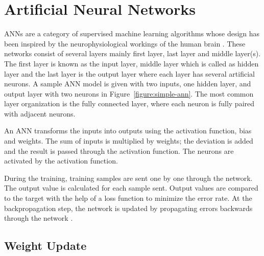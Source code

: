 
\section{Artificial Neural Networks}

    ANNs are a category of supervised machine learning algorithms whose design has been inspired by the neurophysiological workings of the human brain \cite{hill1994artificial}.
    These networks consist of several layers mainly first layer, last layer and middle layer(s).
    The first layer is known as the input layer, middle layer which is called as hidden layer and the last layer is the output layer where each layer has several artificial neurons.
    A sample ANN  model is given with two inputs, one hidden layer, and output layer with two neurons \cite{babu2000adaptive} in Figure~\ref{figure:simple-ann}.
    The most common layer organization is the fully connected layer, where each neuron is fully paired with adjacent neurons.

    An ANN transforms the inputs into outputs using the activation function, bias and weights.
    The sum of inputs is multiplied by weights; the deviation is added and the result is passed through the activation function.
    The neurons are activated by the activation function.

    

    During the training, training samples are sent one by one through the network.
    The output value is calculated for each sample sent.
    Output values are compared to the target with the help of a loss function to minimize the error rate.
    At the backpropagation step, the network is updated by propagating errors backwards through the network \cite{lecun1988theoretical}.

    \subsection{Weight Update}

